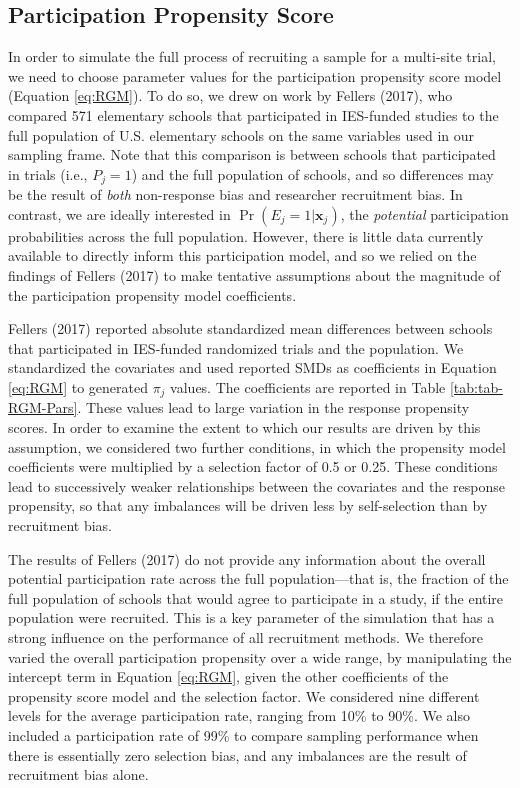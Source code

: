 \documentclass[
  english,
  man,floatsintext]{apa6}
\begin{document}
\hypertarget{participation-propensity-score}{%
\subsection*{Participation Propensity Score}\label{participation-propensity-score}}

In order to simulate the full process of recruiting a sample for a multi-site trial, we need to choose parameter values for the participation propensity score model (Equation \eqref{eq:RGM}).
To do so, we drew on work by Fellers (2017), who compared 571 elementary schools that participated in IES-funded studies to the full population of U.S. elementary schools on the same variables used in our sampling frame.
Note that this comparison is between schools that participated in trials (i.e., \(P_j = 1\)) and the full population of schools, and so differences may be the result of \emph{both} non-response bias and researcher recruitment bias.
In contrast, we are ideally interested in \(\Pr(E_j = 1 | \mathbf{x}_j)\), the \emph{potential} participation probabilities across the full population.
However, there is little data currently available to directly inform this participation model, and so we relied on the findings of Fellers (2017) to make tentative assumptions about the magnitude of the participation propensity model coefficients.

Fellers (2017) reported absolute standardized mean differences between schools that participated in IES-funded randomized trials and the population. We standardized the covariates and used reported SMDs as coefficients in Equation \eqref{eq:RGM} to generated \(\pi_j\) values. The coefficients are reported in Table \ref{tab:tab-RGM-Pars}.
These values lead to large variation in the response propensity scores. In order to examine the extent to which our results are driven by this assumption, we considered two further conditions, in which the propensity model coefficients were multiplied by a selection factor of 0.5 or 0.25.
These conditions lead to successively weaker relationships between the covariates and the response propensity, so that any imbalances will be driven less by self-selection than by recruitment bias.

The results of Fellers (2017) do not provide any information about the overall potential participation rate across the full population---that is, the fraction of the full population of schools that would agree to participate in a study, if the entire population were recruited. This is a key parameter of the simulation that has a strong influence on the performance of all recruitment methods. We therefore varied the overall participation propensity over a wide range, by manipulating the intercept term in Equation \eqref{eq:RGM}, given the other coefficients of the propensity score model and the selection factor. We considered nine different levels for the average participation rate, ranging from 10\% to 90\%. We also included a participation rate of 99\% to compare sampling performance when there is essentially zero selection bias, and any imbalances are the result of recruitment bias alone.
\end{document}

